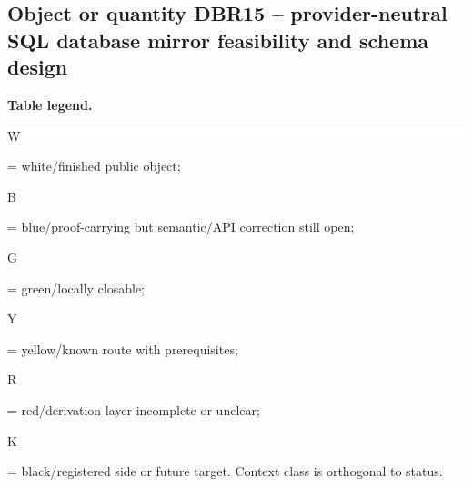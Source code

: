 \subsection*{Object or quantity DBR15 -- provider-neutral SQL database mirror feasibility and schema design}
\hypertarget{objproof:DBR15}{}
\par\smallskip\noindent\begin{minipage}{0.99\linewidth}\footnotesize\raggedright\textbf{Table legend.} \colorbox{white}{\strut W} = white/finished public object; \colorbox{cyan!20}{\strut B} = blue/proof-carrying but semantic/API correction still open; \colorbox{green!18}{\strut G} = green/locally closable; \colorbox{yellow!25}{\strut Y} = yellow/known route with prerequisites; \colorbox{red!20}{\strut R} = red/derivation layer incomplete or unclear; \colorbox{black!18}{\strut K} = black/registered side or future target. Context class is orthogonal to status.\end{minipage}\par\vspace{0.25em}
